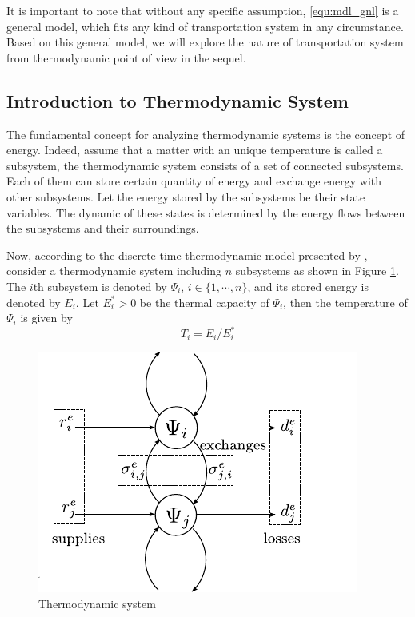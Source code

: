\documentclass[trsc,nonblindrev]{informs3} %
\begin{document}
It is important to note that without any specific assumption,
\eqref{equ:mdl_gnl} is a general model, which fits any kind of
transportation system in any circumstance. Based on this general
model, we will explore the nature of transportation system from
thermodynamic point of view in the sequel.

\subsection{Introduction to Thermodynamic System}

The fundamental concept for analyzing   thermodynamic
systems is the concept of energy. Indeed, assume that a matter with
an unique temperature is called a subsystem, the thermodynamic system
consists of a set of connected subsystems. Each of them can store
certain quantity of energy and exchange energy with other subsystems.
Let the energy stored by the subsystems be their state variables. The
dynamic of these states is determined by the energy flows between the
subsystems and their surroundings.

Now, according to the discrete-time thermodynamic model presented by
\citet{haddad_thermodynamic_2005}, consider a thermodynamic system
including $n$ subsystems as shown in Figure \ref{fig:Ther_Sys}. The
$i$th subsystem is denoted by $\Psi_i$, $i\in \{1,\cdots,n\}$, and
its stored energy is denoted by $E_i$. Let $E_i^*>0$ be the thermal
capacity of $\Psi_i$, then the temperature of $\Psi_i$ is given by
\begin{equation}\label{equ:temperature}
    T_i= {E_i}/{E^*_i}
\end{equation}

\begin{figure}[ht]
  \centering
  \includegraphics{pics/HModel}
  \caption{Thermodynamic system}
  \label{fig:Ther_Sys}
\end{figure}
\end{document}
